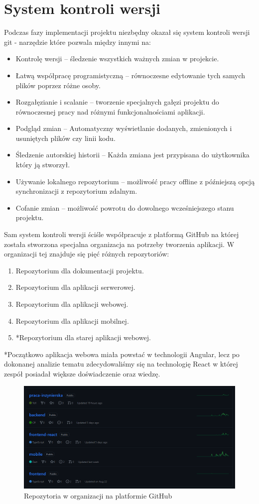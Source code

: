 \documentclass[a4paper,twoside,12pt]{book}
\begin{document}
\section{System kontroli wersji}
Podczas fazy implementacji projektu niezbędny okazał się system kontroli wersji git - narzędzie które pozwala między innymi na:
\begin{itemize}
    \item Kontrolę wersji -- śledzenie wszystkich ważnych zmian w projekcie.
    \item Łatwą współpracę programistyczną -- równoczesne edytowanie tych samych plików poprzez różne osoby.
    \item Rozgałęzianie i scalanie -- tworzenie specjalnych gałęzi projektu do równoczesnej pracy nad różnymi funkcjonalnościami aplikacji.
    \item Podgląd zmian -- Automatyczny wyświetlanie dodanych, zmienionych i usuniętych plików czy linii kodu.
    \item Śledzenie autorskiej historii -- Każda zmiana jest przypisana do użytkownika który ją stworzył.
    \item Używanie lokalnego repozytorium -- możliwość pracy offline z późniejszą opcją synchronizacji z repozytorium zdalnym.
    \item Cofanie zmian -- możliwość powrotu do dowolnego wcześniejszego stanu projektu.
\end{itemize}
Sam system kontroli wersji ściśle współpracuje z platformą GitHub na której została stworzona specjalna organizacja na potrzeby tworzenia aplikacji. W organizacji tej znajduje się pięć różnych repozytoriów:
\begin{enumerate}
    \item Repozytorium dla dokumentacji projektu.
    \item Repozytorium dla aplikacji serwerowej.
    \item Repozytorium dla aplikacji webowej.
    \item Repozytorium dla aplikacji mobilnej.
    \item *Repozytorium dla starej aplikacji webowej.
\end{enumerate}
*Początkowo aplikacja webowa miała powstać w technologii Angular, lecz po dokonanej analizie tematu zdecydowaliśmy się na technologię React w której zespół posiadał większe doświadczenie oraz wiedzę.
\begin{figure}[H]
    \centering
    \includegraphics[width=1\textwidth]{github_ss/organizacja.png}
    \caption{Repozytoria w organizacji na platformie GitHub}
\end{figure}
\end{document}
